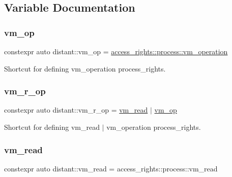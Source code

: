 \subsection{Variable Documentation}
\mbox{\label{namespacedistant_af02d4223cd2f509cc373ac9d83655f19}} 
\subsubsection{\texorpdfstring{vm\+\_\+op}{vm\_op}}
{\footnotesize\ttfamily constexpr auto distant\+::vm\+\_\+op = \mbox{\hyperlink{structdistant_1_1access__rights_ae153052a690584111c46ec7a78d1ef81a1dbc93eb33b2397084a918dd12439860}{access\+\_\+rights\+::process\+::vm\+\_\+operation}}}



Shortcut for defining vm\+\_\+operation process\+\_\+rights. 

\mbox{\label{namespacedistant_a22f555d49d1219029220e53628459768}} 
\subsubsection{\texorpdfstring{vm\+\_\+r\+\_\+op}{vm\_r\_op}}
{\footnotesize\ttfamily constexpr auto distant\+::vm\+\_\+r\+\_\+op = \mbox{\hyperlink{namespacedistant_a671e87e004e808bfc0d54a4e816981df}{vm\+\_\+read}} $\vert$ \mbox{\hyperlink{namespacedistant_af02d4223cd2f509cc373ac9d83655f19}{vm\+\_\+op}}}



Shortcut for defining vm\+\_\+read $\vert$ vm\+\_\+operation process\+\_\+rights. 

\mbox{\label{namespacedistant_a671e87e004e808bfc0d54a4e816981df}} 
\subsubsection{\texorpdfstring{vm\+\_\+read}{vm\_read}}
{\footnotesize\ttfamily constexpr auto distant\+::vm\+\_\+read = access\+\_\+rights\+::process\+::vm\+\_\+read}



